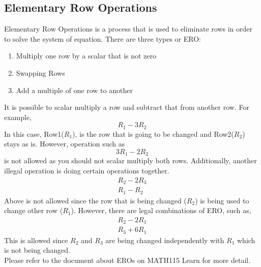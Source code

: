 \documentclass[12pt]{article}
\begin{document}
\subsection{Elementary Row Operations}
Elementary Row Operations is a process that is used to eliminate rows in order to solve the system of equation. There are three types or ERO:
\begin{enumerate}
\item Multiply one row by a scalar that is not zero
\item Swapping Rows
\item Add a multiple of one row to another
\end{enumerate}
It is possible to scalar multiply a row and subtract that from another row. For example, 
\begin{equation}
R_1-3R_2
\end{equation}
In this case, Row1($R_1$), is the row that is going to be changed and Row2($R_2$) stays as is. 
However, operation such as 
\begin{equation}
3R_1 - 2R_2
\end{equation}
is not allowed as you should not scalar multiply both rows. 
Additionally, another illegal operation is doing certain operations together.
\begin{equation}
\begin{split}
R_2-2R_3\\
R_1-R_2
\end{split}
\end{equation}
Above is not allowed since the row that is being changed ($R_2$) is being used to change other row ($R_1$).
However, there are legal combinations of ERO, such as,
\begin{equation}
\begin{split}
R_2-2R_1\\
R_3+6R_1
\end{split}
\end{equation}
This is allowed since $R_2$ and $R_3$ are being changed independently with $R_1$ which is not being changed.\\
Please refer to the document about EROs on MATH115 Learn for more detail.
\end{document}
